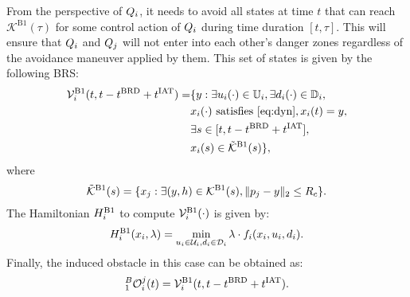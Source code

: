 \begin{itemize}[leftmargin=*]
From the perspective of $Q_i$, it needs to avoid all states at time $t$ that can reach $\mathcal{K}^{\text{B1}}(\tau)$ for some control action of $Q_i$ during time duration $[t, \tau]$. This will ensure that $Q_i$ and $Q_j$ will not enter into each other's danger zones regardless of the avoidance maneuver applied by them. This set of states is given by the following BRS:
\begin{equation}  \label{eq:ObsBRS_case1_caseB}
\begin{aligned}
\brs^{\text{B1}}_{i}(t, t-\brd+\iat) = & \{y: \exists \ctrl_i(\cdot) \in \cfset_i, \exists \dstb_i(\cdot) \in \dfset_i, \\
& \state_i(\cdot) \text{ satisfies \eqref{eq:dyn}}, \state_i(t) = y, \\
& \exists s \in [t, t-\brd+\iat],\\
& \state_i(s) \in \tilde{\mathcal{K}}^{\text{B1}}(s)\},
\end{aligned}
\end{equation}
where
\begin{equation*}
\tilde{\mathcal{K}}^{\text{B1}}(s) = \{x_j: \exists (y, h) \in \mathcal{K}^{\text{B1}}(s), \|p_j - y\|_2 \le R_c \}.
\end{equation*} 
The Hamiltonian $H^{\text{B1}}_{i}$ to compute $\mathcal{V}^{\text{B1}}_{i}(\cdot)$ is given by:
\begin{equation} \label{eqn:BRS_obsham_case1_caseB}
\ham^{\text{B1}}_{i}(\state_i, \costate) = \min_{\ctrl_i \in \cset_i, \dstb_i \in \dset_i} \costate \cdot f_i (\state_i, \ctrl_i, \dstb_i).
\end{equation}
Finally, the induced obstacle in this case can be obtained as:
\begin{equation} \label{eq:intruderObs_case1_caseB} 
_1^B\ioset_i^j(t) = \brs^{\text{B1}}_{i}(t, t-\brd+\iat).
\end{equation}
\end{itemize}